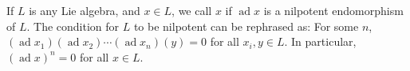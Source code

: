 If $L$ is any Lie algebra, and $x \in L$, we call $x$  if $\operatorname{ad} x$ is a nilpotent endomorphism of $L$. The condition for $L$ to be nilpotent can be rephrased as: For some $n$, $(\operatorname{ad} x_1)(\operatorname{ad} x_2) \cdots (\operatorname{ad} x_n)(y) = 0$ for all $x_i, y \in L$. In particular, $(\operatorname{ad} x)^n = 0$ for all $x \in L$.

